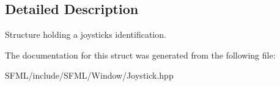 \subsection{Detailed Description}
Structure holding a joystick\textquotesingle{}s identification. 

\begin{DoxyVerb}\end{DoxyVerb}
 

The documentation for this struct was generated from the following file\+:\begin{DoxyCompactItemize}
\item 
S\+F\+M\+L/include/\+S\+F\+M\+L/\+Window/Joystick.\+hpp\end{DoxyCompactItemize}
